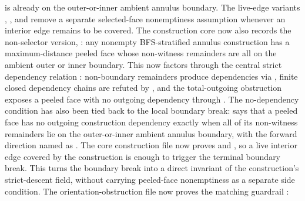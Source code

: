 \documentclass[11pt]{article}
\begin{document}
\begin{itemize}
is already on the outer-or-inner ambient annulus boundary.  The live-edge
variants
,
,
and
remove a separate selected-face nonemptiness assumption whenever an interior
edge remains to be covered.  The construction core
now also records the non-selector version,
:
any nonempty BFS-stratified annulus construction has a maximum-distance peeled
face whose non-witness remainders are all on the ambient outer or inner boundary.
This now factors through the central strict dependency relation
: non-boundary
remainders produce dependencies via
,
finite closed dependency chains are refuted by
,
and the total-outgoing obstruction
exposes a peeled face with no outgoing dependency through
.
The no-dependency condition has also been tied back to the local boundary break:
says that a peeled face has no outgoing construction dependency exactly when all
of its non-witness remainders lie on the outer-or-inner ambient annulus
boundary, with the forward direction named as
.
The core construction file now proves
and
,
so a live interior edge covered by the construction is enough to trigger the
terminal boundary break.  This turns the boundary break into a direct invariant
of the construction's strict-descent field, without carrying peeled-face
nonemptiness as a separate side condition.  The orientation-obstruction file
now proves the matching guardrail
:

\end{itemize}
\end{document}
